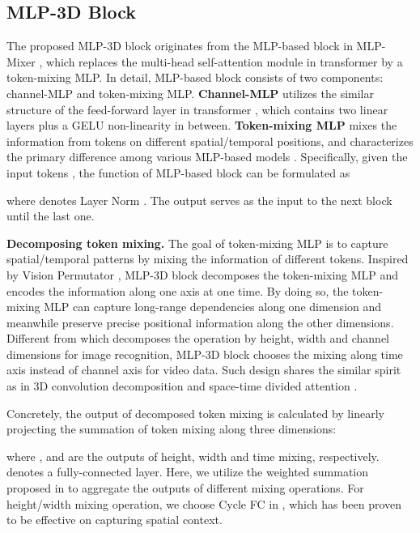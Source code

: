 \documentclass[10pt,twocolumn,letterpaper]{article}
\begin{document}
\subsection{MLP-3D Block}
The proposed MLP-3D block originates from the MLP-based block in MLP-Mixer \cite{tolstikhin2021mlp}, which replaces the multi-head self-attention module in transformer by a token-mixing MLP. In detail, MLP-based block consists of two components: channel-MLP and token-mixing MLP. \textbf{Channel-MLP} utilizes the similar structure of the feed-forward layer in transformer \cite{vaswani2017attention}, which contains two linear layers plus a GELU \cite{hendrycks2016gaussian} non-linearity in between. \textbf{Token-mixing MLP} mixes the information from tokens on different spatial/temporal positions, and characterizes the primary difference among various MLP-based models \cite{tolstikhin2021mlp,yu2021s,chen2021cyclemlp,hou2021vision}. Specifically, given the input tokens , the function of MLP-based block can be formulated as

where  denotes Layer Norm \cite{ba2016layer}. The output  serves as the input to the next block until the last one.

\textbf{Decomposing token mixing.} The goal of token-mixing MLP is to capture spatial/temporal patterns by mixing the information of different tokens. Inspired by Vision Permutator \cite{hou2021vision}, MLP-3D block decomposes the token-mixing MLP and encodes the information along one axis at one time. By doing so, the token-mixing MLP can capture long-range dependencies along one dimension and meanwhile preserve precise positional information along the other dimensions. Different from \cite{hou2021vision} which decomposes the operation by height, width and channel dimensions for image recognition, MLP-3D block chooses the mixing along time axis instead of channel axis for video data. Such design shares the similar spirit as in 3D convolution decomposition \cite{qiu2017learning,xie2018rethinking,tran2018closer} and space-time divided attention \cite{bertasius2021space,arnab2021vivit}.

Concretely, the output of decomposed token mixing  is calculated by linearly projecting the summation of token mixing along three dimensions:

where ,  and  are the outputs of height, width and time mixing, respectively.  denotes a fully-connected layer. Here, we utilize the weighted summation proposed in \cite{hou2021vision} to aggregate the outputs of different mixing operations. For height/width mixing operation, we choose Cycle FC in \cite{chen2021cyclemlp}, which has been proven to be effective on capturing spatial context.
\end{document}
